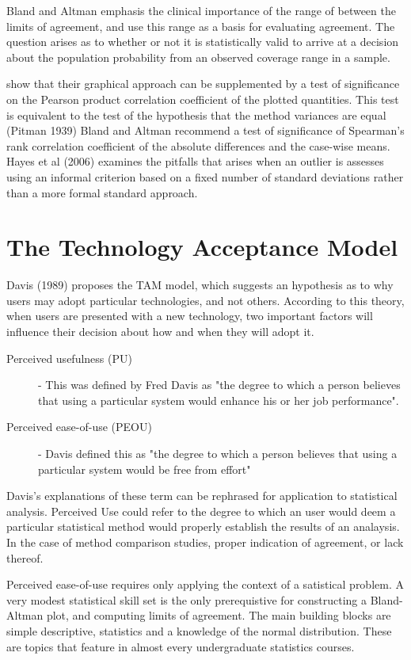 \documentclass[MAIN.tex]{subfiles}
\begin{document}
Bland and Altman emphasis the clinical importance of the range of between the limits of agreement, and use this range as a basis for evaluating agreement.
The question arises as to whether  or not it is statistically valid to arrive at a decision about the population probability from an observed coverage range in a sample.

\citet{BA83} show that their graphical approach can be supplemented by a test of significance on the Pearson product correlation coefficient of the plotted quantities. This test is equivalent to the test of the hypothesis that the method variances are equal (Pitman 1939)
Bland and Altman recommend a test of significance of Spearman’s rank correlation coefficient of the absolute differences and the case-wise means.
Hayes et al (2006) examines the pitfalls that arises when an outlier is assesses using an informal criterion based on a fixed number of standard deviations rather than a more formal standard approach.
\newpage
\section{The Technology Acceptance Model}
Davis (1989) proposes the TAM model, which suggests an hypothesis as to why users may adopt particular technologies, and not others. 
According to this theory, when users are presented with a new 
technology, two important factors will influence their decision about how and when they will adopt it.
\begin{description}
	\item[Perceived usefulness (PU)] - This was defined by Fred Davis as "the degree to which a person believes that using a particular system would enhance his or her job performance".
	\item[Perceived ease-of-use (PEOU)] - Davis defined this as "the degree to which a person believes that using a particular system would be free from effort" 
\end{description}

Davis's explanations of these term can be rephrased for application to statistical analysis. 
Perceived Use could refer to the degree to which an user would deem a particular statistical method would properly establish the results of an analaysis. In the case of method comparison studies, proper indication of agreement, or lack thereof.


Perceived ease-of-use requires only applying the context of a satistical problem. A very modest statistical skill set is the only prerequistive for constructing a Bland-Altman plot, and computing limits of agreement. The main building blocks 
are simple descriptive, statistics and a knowledge of the normal distribution. These are topics that feature in almost every undergraduate statistics courses.
\end{document}
